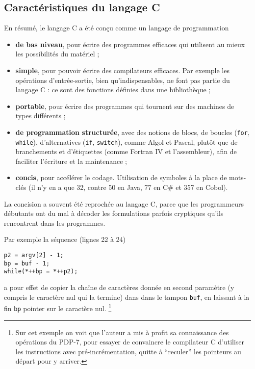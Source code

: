 \documentclass[10pt]{article}
\begin{document}
\subsection{Caractéristiques du langage C}

En résumé, le langage C a été conçu comme un langage de programmation 
\begin{itemize}
\item \textbf{de bas niveau}, pour écrire des programmes
efficaces qui utilisent au mieux les possibilités du matériel ;
\item \textbf{simple}, pour pouvoir écrire des compilateurs efficaces. 
Par exemple les opérations d'entrée-sortie, bien qu'indispensables, 
ne font pas partie du langage C :
ce sont des fonctions définies dans une bibliothèque ;
\item \textbf{portable}, pour écrire des programmes qui tournent
sur des machines de types différents ;
\item \textbf{de programmation structurée}, avec des notions de blocs,
  de boucles (\texttt{for}, \texttt{while}), d'alternatives
  (\texttt{if}, \texttt{switch}), comme Algol et Pascal, plutôt que de
  branchements et d'étiquettes (comme Fortran IV et l'assembleur),
  afin de faciliter l'écriture et la maintenance ; 
\item \textbf{concis}, pour accélérer le codage. Utilisation de symboles
à la place de mots-clés (il n'y en a que 32,  contre 50 en Java, 
77 en C\# et 357 en Cobol).
\end{itemize}

La concision a souvent été reprochée au langage C, parce que les
programmeurs débutants ont du mal à décoder les formulations
parfois cryptiques qu'ils rencontrent dans les programmes.

Par exemple la séquence (lignes 22 à 24)

\begin{verbatim}
p2 = argv[2] - 1;
bp = buf - 1;
while(*++bp = *++p2);
\end{verbatim}

a pour effet de copier la chaîne de caractères donnée en second paramètre 
(y compris le  caractère nul qui la termine) dans
 dans le tampon \texttt{buf}, en laissant à la fin \texttt{bp}
 pointer sur le caractère nul. \footnote{Sur cet exemple on voit que l'auteur a mis à profit sa connaissance
des opérations du PDP-7, pour essayer de convaincre le compilateur C
d'utiliser les instructions avec pré-incrémentation, quitte à ``reculer''
les pointeurs au départ pour y arriver.}
\end{document}
